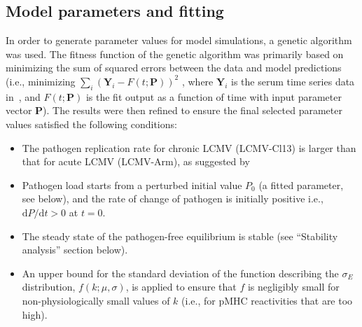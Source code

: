 \clearpage
\clearpage

\subsection{Model parameters and fitting}
\label{sec:AvC_modelParsFitting}

In order to generate parameter values for model simulations, a genetic algorithm was used. The fitness function of the genetic algorithm was primarily based on minimizing the sum of squared errors between the data and model predictions (i.e., minimizing $\sum_i(\mathbf{Y}_i-F(t;\mathbf{P}))^2$ , where $\mathbf{Y}_i$ is the serum time series data in~\cite{wherry2003viral}, and $F(t;\mathbf{P})$ is the fit output as a function of time with input parameter vector $\mathbf{P}$). The results were then refined to ensure the final selected parameter values satisfied the following conditions:
\begin{itemize}
    \item The pathogen replication rate for chronic LCMV (LCMV-Cl13) is larger than that for acute LCMV (LCMV-Arm), as suggested by~\cite{bergthaler2010viral,sullivan2011point}
    \item Pathogen load starts from a perturbed initial value $P_0$ (a fitted parameter, see below), and the rate of change of pathogen is initially positive i.e., $\textrm{d}P/\textrm{d}t>0$ at $t=0$.
    \item The steady state of the pathogen-free equilibrium is stable (see “Stability analysis” section below).
    \item An upper bound for the standard deviation of the function describing the $\sigma_E$ distribution, $f(k; \mu,\sigma)$, is applied to ensure that $f$ is negligibly small for non-physiologically small values of $k$ (i.e., for pMHC reactivities that are too high).
\end{itemize}

